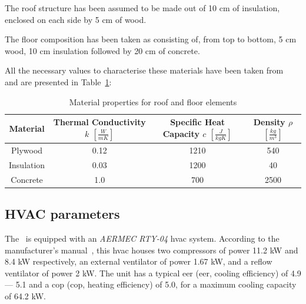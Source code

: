 
The roof structure has been assumed to be made out of 10 cm of insulation,
enclosed on each side by 5 cm of wood.


The floor composition has been taken as consisting of, from top to bottom, 5 cm
wood, 10 cm insulation followed by 20 cm of concrete. 

All the necessary values to characterise these materials have been taken
from~\cite{BuildingsHeatTransferData} and are presented in
Table~\ref{tab:material_properties}: 

\begin{table}[ht]
\centering
    \begin{tabular}{||c c c c||}
        \hline
        Material & Thermal Conductivity $k$ $[\frac{W}{mK}]$ & Specific Heat
        Capacity $c$ $[\frac{J}{kgK}]$ & Density $\rho$ $[\frac{kg}{m^3}]$
        \\
        \hline \hline
        Plywood & 0.12 & 1210 & 540 \\
        Insulation & 0.03 & 1200 & 40 \\
        Concrete & 1.0 & 700 & 2500 \\
        \hline
    \end{tabular}
    \caption{Material properties for roof and floor elements}
\label{tab:material_properties}
\end{table}

\subsection{HVAC parameters}\label{sec:HVAC_parameters}

The \pdome\ is equipped with an \textit{AERMEC RTY-04} \acrshort{hvac} system.
According to the manufacturer's manual~\cite{aermecRoofTopManuelSelection}, this
\acrshort{hvac} houses two compressors of power 11.2 kW and 8.4 kW respectively,
an external ventilator of power 1.67 kW, and a reflow ventilator of power 2 kW.
The unit has a typical \acrlong{eer} (\acrshort{eer}, cooling efficiency) of 4.9
--- 5.1 and a \acrlong{cop} (\acrshort{cop}, heating efficiency) of 5.0, for a
maximum cooling capacity of 64.2 kW. 

